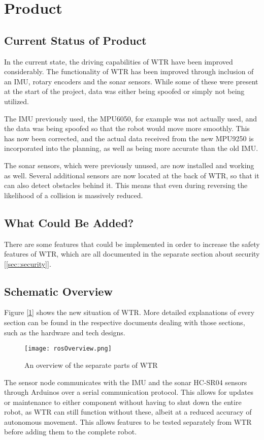 \section{Product}
\subsection{Current Status of Product}
In the current state, the driving capabilities of WTR have been improved considerably.
The functionality of WTR has been improved through inclusion of an IMU, rotary encoders and the sonar sensors.
While some of these were present at the start of the project, data was either being spoofed or simply not being utilized.

The IMU previously used, the MPU6050, for example was not actually used, and the data was being spoofed so that the robot would move more smoothly.
This has now been corrected, and the actual data received from the new MPU9250 is incorporated into the planning, as well as being more accurate than the old IMU.

The sonar sensors, which were previously unused, are now installed and working as well.
Several additional sensors are now located at the back of WTR, so that it can also detect obstacles behind it.
This means that even during reversing the likelihood of a collision is massively reduced.

\subsection{What Could Be Added?}
There are some features that could be implemented in order to increase the safety features of WTR, which are all documented in the separate section about security [\ref{sec::security}].

\subsection{Schematic Overview}
Figure [\ref{fig::schemView}] shows the new situation of WTR.
More detailed explanations of every section can be found in the respective documents dealing with those sections, such as the hardware and tech designs.
\begin{figure}[H]
\centering
\texttt{[image: rosOverview.png]}
\caption{An overview of the separate parts of WTR}
\label{fig::schemView}
\end{figure}

The sensor node communicates with the IMU and the sonar HC-SR04 sensors through Arduinos over a serial communication protocol.
This allows for updates or maintenance to either component without having to shut down the entire robot, as WTR can still function without these, albeit at a reduced accuracy of autonomous movement.
This allows features to be tested separately from WTR before adding them to the complete robot.


